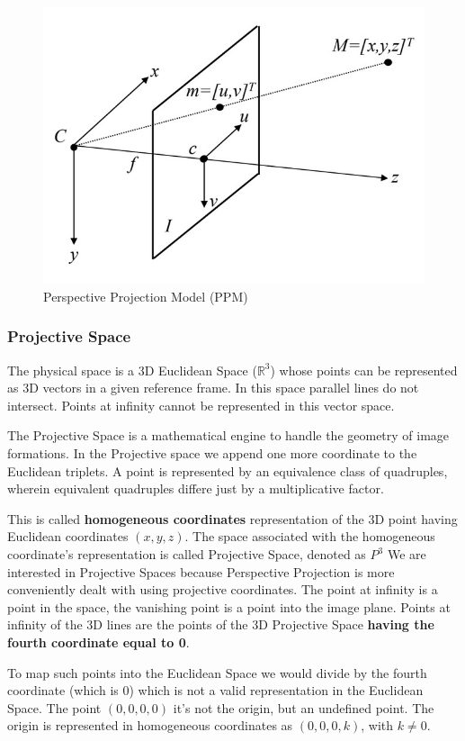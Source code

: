\documentclass{article}
\begin{document}
\begin{figure}[htbp]
  \centering
  \includegraphics[width=0.5\linewidth]{./img/camera_calibration.jpg}
  \caption{Perspective Projection Model (PPM)}
  \label{fig:camera calibration}
\end{figure}

\subsubsection{Projective Space}

The physical space is a 3D Euclidean Space ($\mathbb{R}^3$) whose points can be represented as 3D vectors in a given reference frame.
In this space parallel lines do not intersect.
Points at infinity cannot be represented in this vector space.

The Projective Space is a mathematical engine to handle the geometry of image formations.
In the Projective space we append one more coordinate to the Euclidean triplets.
A point is represented by an equivalence class of quadruples, wherein equivalent quadruples differe just by a multiplicative factor.

This is called \textbf{homogeneous coordinates} representation of the 3D point having Euclidean coordinates $(x,y,z)$.
The space associated with the homogeneous coordinate's representation is called Projective Space, denoted as $P^3$
\vspace{1em}
We are interested in Projective Spaces because Perspective Projection is more conveniently dealt with using projective coordinates.
\vspace{1em}
The point at infinity is a point in the space, the vanishing point is a point into the image plane.
Points at infinity of the 3D lines are the points of the 3D Projective Space \textbf{having the fourth coordinate equal to 0}.

To map such points into the Euclidean Space we would divide by the fourth coordinate (which is 0) which is not a valid representation in the Euclidean Space.
The point $(0,0,0,0)$ it's not the origin, but an undefined point. The origin is represented in homogeneous coordinates as $(0,0,0,k)$, with $k\neq 0$.
\end{document}
